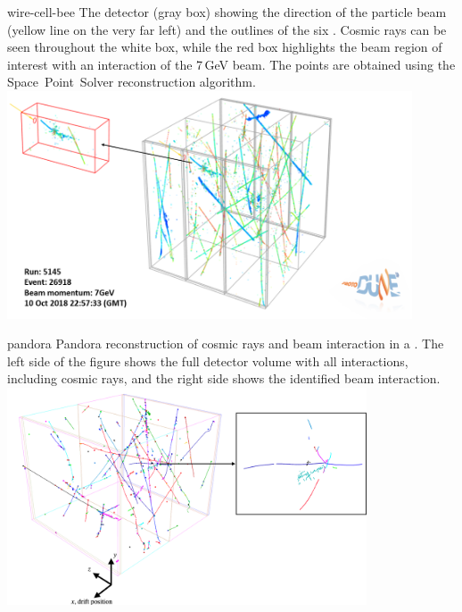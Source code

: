 \documentclass[../main-v1.tex]{subfiles}
\begin{document}
\begin{dunefigure}
{wire-cell-bee} %
{The  detector (gray box) showing 
the direction of the particle beam (yellow line on the very far left) and the outlines of the six . Cosmic rays
can be seen throughout the white box, while the red box highlights the beam region of interest with an interaction of the 7\,GeV beam. 
The \threed points are obtained using the Space~Point~Solver reconstruction algorithm.}
\includegraphics[width=0.9\textwidth]{graphics/IntroFigures/Fig_06_bee_event.png}
\end{dunefigure}


\begin{dunefigure}
{pandora}
{Pandora  reconstruction of cosmic rays and beam interaction in a  . The left side of the figure shows the full detector volume with all interactions, including cosmic rays, and the right side shows the identified beam interaction.}
\includegraphics[width=0.8\textwidth]{graphics/IntroFigures/Fig_07_pandora.png}
\end{dunefigure}
\end{document}
